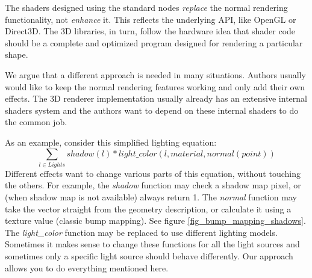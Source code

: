 \documentclass{egpubl}
\begin{document}
The shaders designed using the standard nodes
\textit{replace} the normal rendering functionality, not \textit{enhance} it.
This reflects the underlying API, like OpenGL or Direct3D.
The 3D libraries, in turn, follow the hardware idea that shader code
should be a complete and optimized program
designed for rendering a particular shape.

We argue that a different approach is needed in many situations.
Authors usually would like to keep the normal rendering features working
and only add their own effects. The 3D renderer
implementation usually already has an extensive internal shaders system
and the authors want to depend on these internal shaders
to do the common job.

As an example, consider this simplified lighting equation:
$$ \sum_{l\in Lights} shadow(l) * light\_color(l, material, normal(point)) $$
Different effects want to change various parts of this equation,
without touching the others.
For example, the \textit{shadow} function may check a shadow map pixel,
or (when shadow map is not available) always return 1.
The \textit{normal} function may take the vector straight from
the geometry description, or calculate it using a texture value (classic bump mapping).
See figure \ref{fig_bump_mapping_shadows}.
The \textit{light\_color} function may be replaced to use different
lighting models.
Sometimes it makes sense to change these functions
for all the light sources and sometimes only a specific light source
should behave differently.
Our approach allows you to do everything mentioned here.
\end{document}
